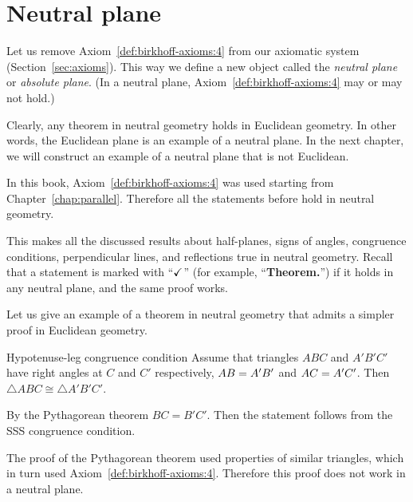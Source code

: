 
\chapter{Neutral plane}\label{chap:non-euclid}

Let us remove Axiom~\ref{def:birkhoff-axioms:4} from our axiomatic system (Section~\ref{sec:axioms}).
This way we define a new object called the 
\emph{neutral plane} or \emph{absolute plane}.
(In a neutral plane, Axiom~\ref{def:birkhoff-axioms:4} may or may not hold.)

Clearly, any theorem in neutral geometry holds in Euclidean geometry.
In other words, the Euclidean plane is an example of a neutral plane. 
In the next chapter, we will construct an example of a neutral plane that is not Euclidean.

In this book, 
Axiom~\ref{def:birkhoff-axioms:4} was used starting from Chapter~\ref{chap:parallel}.
Therefore all the statements before hold in neutral geometry.

This makes all the discussed results
about
half-planes,
signs of angles,
congruence conditions,
perpendicular lines,
and reflections 
true in neutral geometry.
Recall that a statement is marked with ``$\checkmark$''\label{a-mark} (for example, ``\textbf{Theorem.\abs}'') if it holds in any neutral plane, and the same proof works.


Let us give an example of a theorem in neutral geometry that admits a simpler proof in Euclidean geometry. 

\begin{thm}{Hypotenuse-leg congruence condition}\label{thm:hypotenuse-leg}
Assume that triangles $ABC$ and $A'B'C'$
have right angles at $C$ and $C'$ respectively, 
$AB=A'B'$ and $AC=A'C'$.
Then $\triangle ABC\cong\triangle A'B'C'$.
\end{thm}


By the Pythagorean theorem $BC=B'C'$.
Then the statement follows from the SSS congruence condition.
\qeds

The proof of the Pythagorean theorem used properties of similar triangles, which in turn used Axiom~\ref{def:birkhoff-axioms:4}. 
Therefore this proof does not work in a neutral plane.

